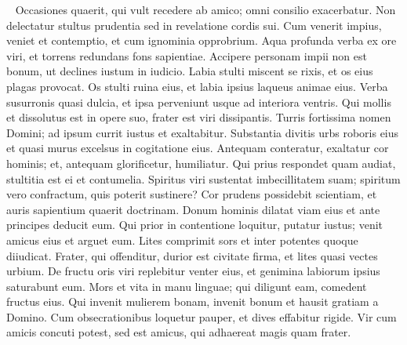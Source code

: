\begin{biblechapter}   
\verse Occasiones quaerit, qui vult recedere ab amico; omni consilio exacerbatur. 
\verse Non delectatur stultus prudentia sed in revelatione cordis sui. 
\verse Cum venerit impius, veniet et contemptio, et cum ignominia opprobrium. 
\verse Aqua profunda verba ex ore viri, et torrens redundans fons sapientiae. 
\verse Accipere personam impii non est bonum, ut declines iustum in iudicio. 
\verse Labia stulti miscent se rixis, et os eius plagas provocat. 
\verse Os stulti ruina eius, et labia ipsius laqueus animae eius. 
\verse Verba susurronis quasi dulcia, et ipsa perveniunt usque ad interiora ventris. 
\verse Qui mollis et dissolutus est in opere suo, frater est viri dissipantis. 
\verse Turris fortissima nomen Domini; ad ipsum currit iustus et exaltabitur. 
\verse Substantia divitis urbs roboris eius et quasi murus excelsus in cogitatione eius. 
\verse Antequam conteratur, exaltatur cor hominis; et, antequam glorificetur, humiliatur. 
\verse Qui prius respondet quam audiat, stultitia est ei et contumelia. 
\verse Spiritus viri sustentat imbecillitatem suam; spiritum vero confractum, quis poterit sustinere? 
\verse Cor prudens possidebit scientiam, et auris sapientium quaerit doctrinam. 
\verse Donum hominis dilatat viam eius et ante principes deducit eum. 
\verse Qui prior in contentione loquitur, putatur iustus; venit amicus eius et arguet eum. 
\verse Lites comprimit sors et inter potentes quoque diiudicat. 
\verse Frater, qui offenditur, durior est civitate firma, et lites quasi vectes urbium. 
\verse De fructu oris viri replebitur venter eius, et genimina labiorum ipsius saturabunt eum. 
\verse Mors et vita in manu linguae; qui diligunt eam, comedent fructus eius. 
\verse Qui invenit mulierem bonam, invenit bonum et hausit gratiam a Domino. 
\verse Cum obsecrationibus loquetur pauper, et dives effabitur rigide. 
\verse Vir cum amicis concuti potest, sed est amicus, qui adhaereat magis quam frater. 
\end{biblechapter}

